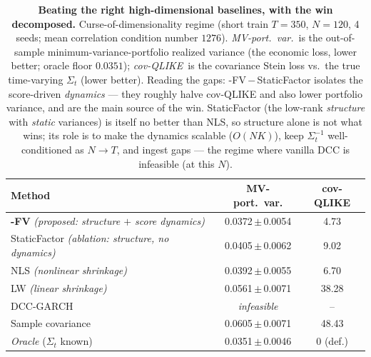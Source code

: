 \begin{table}[t]\centering\small
\setlength{\tabcolsep}{6pt}
\caption{\textbf{Beating the right high-dimensional baselines, with the win
decomposed.} Curse-of-dimensionality regime (short train $T{=}350$, $N{=}120$,
4 seeds; mean correlation condition number $1276$).
\emph{MV-port.\ var.}\ is the out-of-sample minimum-variance-portfolio realized
variance (the economic loss, lower better; oracle floor
$0.0351$); \emph{cov-QLIKE}\ is the covariance Stein loss
vs.\ the true time-varying $\Sigma_t$ (lower better). Reading the gaps:
\cafe{}-FV\,$-$\,StaticFactor isolates the score-driven \emph{dynamics} --- they
roughly halve cov-QLIKE and also lower portfolio variance, and are the main source of the
win. StaticFactor (the low-rank \emph{structure} with \emph{static} variances) is
itself no better than NLS, so structure alone is not what wins; its role is to make the
dynamics scalable ($O(NK)$), keep $\Sigma_t^{-1}$ well-conditioned as $N\!\to\!T$, and
ingest gaps --- the regime where vanilla DCC is infeasible (at this $N$).}
\label{tab:baselines}
\begin{tabular}{@{}lcc@{}}\toprule
Method & MV-port.\ var. & cov-QLIKE \\\midrule
\textbf{\cafe{}-FV} \emph{(proposed: structure $+$ score dynamics)} & 0.0372\,$\pm$\,0.0054 & 4.73 \\
\quad StaticFactor \emph{(ablation: structure, no dynamics)} & 0.0405\,$\pm$\,0.0062 & 9.02 \\
NLS \emph{(nonlinear shrinkage)} & 0.0392\,$\pm$\,0.0055 & 6.70 \\
LW \emph{(linear shrinkage)} & 0.0561\,$\pm$\,0.0071 & 38.28 \\
DCC-GARCH & \emph{infeasible} & -- \\
Sample covariance & 0.0605\,$\pm$\,0.0071 & 48.43 \\
\emph{Oracle} ($\Sigma_t$ known) & 0.0351\,$\pm$\,0.0046 & 0 (def.) \\
\bottomrule\end{tabular}
\end{table}
